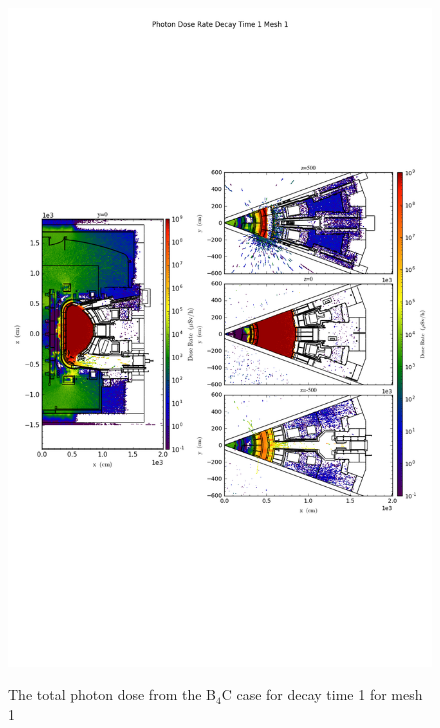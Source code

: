 \begin{figure}[ht!]
\centering
\includegraphics[trim={0cm 9cm 0cm 10cm},clip,scale=0.75]{../plots/final_model_nob4c/Photon_Dose_Rate_Decay_Time_1_Mesh_1.png}
\label{fig:photons_dc1_no4bc_m1_flux}
\caption{The total photon dose from the B$_4$C case for decay time 1 for mesh 1}
\end{figure}
